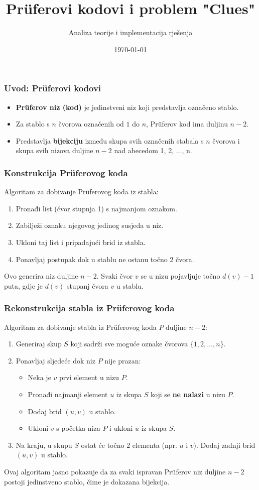 \documentclass{beamer}
\title{Prüferovi kodovi i problem "Clues"}
\author{Analiza teorije i implementacija rješenja}
\date{\today}
\begin{document}
\frame{\titlepage}

\begin{frame}
\frametitle{Uvod: Prüferovi kodovi}
\begin{itemize}
    \item \textbf{Prüferov niz (kod)} je jedinstveni niz koji predstavlja označeno stablo.
    \item Za stablo s $n$ čvorova označenih od $1$ do $n$, Prüferov kod ima duljinu $n-2$.
    \item Predstavlja \textbf{bijekciju} između skupa svih označenih stabala s $n$ čvorova i skupa svih nizova duljine $n-2$ nad abecedom {1, 2, ..., n}.
\end{itemize}
\end{frame}

\begin{frame}
\frametitle{Konstrukcija Prüferovog koda}
Algoritam za dobivanje Prüferovog koda iz stabla:
\begin{enumerate}
    \item Pronađi list (čvor stupnja 1) s najmanjom oznakom.
    \item Zabilježi oznaku njegovog jedinog susjeda u niz.
    \item Ukloni taj list i pripadajući brid iz stabla.
    \item Ponavljaj postupak dok u stablu ne ostanu točno 2 čvora.
\end{enumerate}
\vspace{0.5cm}
Ovo generira niz duljine $n-2$. Svaki čvor $v$ se u nizu pojavljuje točno $d(v) - 1$ puta, gdje je $d(v)$ stupanj čvora $v$ u stablu.
\end{frame}

\begin{frame}
\frametitle{Rekonstrukcija stabla iz Prüferovog koda}
Algoritam za dobivanje stabla iz Prüferovog koda $P$ duljine $n-2$:
\begin{enumerate}
    \item Generiraj skup $S$ koji sadrži sve moguće oznake čvorova $\{1, 2, \dots, n\}$.
    \item Ponavljaj sljedeće dok niz $P$ nije prazan:
    \begin{itemize}
        \item Neka je $v$ prvi element u nizu $P$.
        \item Pronađi najmanji element $u$ iz skupa $S$ koji se \textbf{ne nalazi} u nizu $P$.
        \item Dodaj brid $(u, v)$ u stablo.
        \item Ukloni $v$ s početka niza $P$ i ukloni $u$ iz skupa $S$.
    \end{itemize}
    \item Na kraju, u skupu $S$ ostat će točno 2 elementa (npr. $u$ i $v$). Dodaj zadnji brid $(u, v)$ u stablo.
\end{enumerate}
\vspace{0.3cm}
Ovaj algoritam jasno pokazuje da za svaki ispravan Prüferov niz duljine $n-2$ postoji jedinstveno stablo, čime je dokazana bijekcija.
\end{frame}
\end{document}
